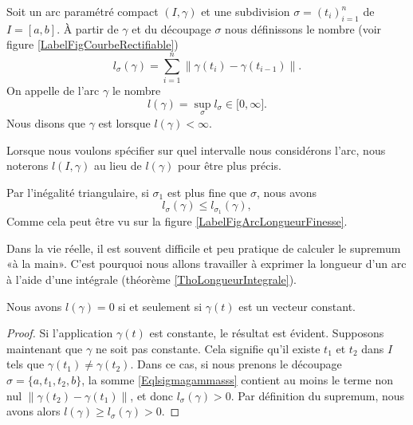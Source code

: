 \newcommand{\CaptionFigCourbeRectifiable}{La longueur d'un découpage. La somme des longueurs des segments droits est facile à calculer.}

\begin{definition}
    
    Soit un arc paramétré compact $(I,\gamma)$ et une subdivision $\sigma=(t_i)_{i=1}^n$ de $I=[a,b]$. À partir de $\gamma$ et du découpage $\sigma$ nous définissons le nombre (voir figure \ref{LabelFigCourbeRectifiable})
    \begin{equation}        \label{Eqlsigmagammasss}
        l_{\sigma}(\gamma)=\sum_{i=1}^n\big\| \gamma(t_i)-\gamma(t_{i-1}) \big\|.
    \end{equation}
    On appelle  de l'arc $\gamma$ le nombre
    \begin{equation}
        l(\gamma)=\sup_{\sigma}l_{\sigma}\in\mathopen[ 0 , \infty \mathclose].
    \end{equation}
    Nous disons que $\gamma$ est  lorsque $l(\gamma)<\infty$.
\end{definition}
Lorsque nous voulons spécifier sur quel intervalle nous considérons l'arc, nous noterons $l(I,\gamma)$ au lieu de $l(\gamma)$ pour être plus précis.

Par l'inégalité triangulaire, si $\sigma_1$ est plus fine que $\sigma$, nous avons
\begin{equation}
    l_{\sigma}(\gamma)\leq l_{\sigma_1}(\gamma),
\end{equation}
Comme cela peut être vu sur la figure \ref{LabelFigArcLongueurFinesse}.
\newcommand{\CaptionFigArcLongueurFinesse}{Il est visible que la longueur donnée par l'approximation par des petits segments (verts) est plus longue et plus précise que celle donnée par les longs segments (rouge).}


Dans la vie réelle, il est souvent difficile et peu pratique de calculer le supremum «à la main». C'est pourquoi nous allons travailler à exprimer la longueur d'un arc à l'aide d'une intégrale (théorème \ref{ThoLongueurIntegrale}).

\begin{lemma}
    Nous avons $l(\gamma)=0$ si et seulement si $\gamma(t)$ est un vecteur constant.
\end{lemma}

\begin{proof}
    Si l'application $\gamma(t)$ est constante, le résultat est évident. Supposons maintenant que $\gamma$ ne soit pas constante. Cela signifie qu'il existe $t_1$ et $t_2$ dans $I$ tels que $\gamma(t_1)\neq \gamma(t_2)$. Dans ce cas, si nous prenons le découpage $\sigma=\{ a,t_1,t_2,b \}$, la somme \eqref{Eqlsigmagammasss} contient au moins le terme non nul $\| \gamma(t_2)-\gamma(t_1) \|$, et donc $l_{\sigma}(\gamma)>0$. Par définition du supremum, nous avons alors $l(\gamma)\geq l_{\sigma}(\gamma)>0$.
\end{proof}

